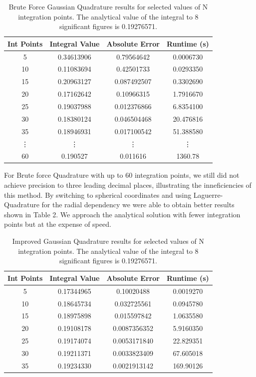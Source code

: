 \documentclass{emulateapj}
\begin{document}
\begin{table}[H]
\caption{Brute Force Gaussian Quadrature results for selected values of N integration points. The analytical value of the integral to 8 significant figures is 0.19276571.}
\label{tab:table1}
\begin{ruledtabular}
\begin{tabular}{cccc}
Int Points & Integral Value & Absolute Error & Runtime (s)\\
\hline
 5 & 0.34613906 & 0.79564642 & 0.0006730\\
 10 & 0.11083694 & 0.42501733 & 0.0293350\\
 15 & 0.20963127 & 0.087492507 & 0.3302690 \\
 20 & 0.17162642 & 0.10966315 & 1.7916670 \\
 25 & 0.19037988 & 0.012376866 & 6.8354100\\
 30 & 0.18380124 & 0.046504468 & 20.476816\\
 35 & 0.18946931 & 0.017100542 & 51.388580\\
 \vdots & \vdots & \vdots & \vdots\\
 60 & 0.190527 & 0.011616 & 1360.78\\
\end{tabular}
\end{ruledtabular}
\end{table}

For Brute force Quadrature with up to 60 integration points, we still did not achieve precision to three leading decimal places, illustrating the inneficiencies of this method. By switching to spherical coordinates and using Laguerre-Quadrature for the radial dependency we were able to obtain better results shown in Table 2. We approach the analytical solution with fewer integration points but at the expense of speed.

\begin{table}[H]
\caption{Improved Gaussian Quadrature results for selected values of N integration points. The analytical value of the integral to 8 significant figures is 0.19276571.}
\label{tab:table2}
\begin{ruledtabular}
\begin{tabular}{cccc}
Int Points & Integral Value & Absolute Error & Runtime (s)\\
\hline
 5 & 0.17344965 & 0.10020488 & 0.0019270\\
 10 & 0.18645734 & 0.032725561 & 0.0945780\\
 15 & 0.18975898 & 0.015597842 & 1.0635580\\
 20 & 0.19108178 & 0.0087356352 & 5.9160350\\
 25 & 0.19174074 & 0.0053171840 & 22.829351\\
 30 & 0.19211371 & 0.0033823409 & 67.605018\\
 35 & 0.19234330 & 0.0021913142 & 169.90126\\
\end{tabular}
\end{ruledtabular}
\end{table}
\end{document}
